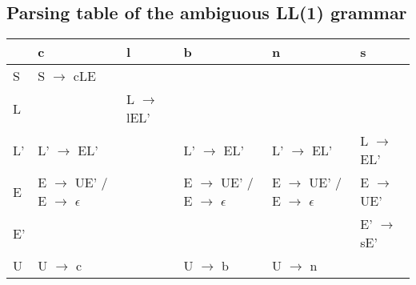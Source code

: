 \documentclass[11pt]{article}
\begin{document}
\subsection{Parsing table of the ambiguous LL(1) grammar}
\label{sec:org758a84c}
\begin{center}
\begin{tabular}{llllll}
 & c & l & b & n & s\\
\hline
S & S \(\rightarrow\) cLE &  &  &  & \\
L &  & L \(\rightarrow\) lEL' &  &  & \\
L' & L' \(\rightarrow\) EL' &  & L' \(\rightarrow\) EL' & L' \(\rightarrow\) EL' & L \(\rightarrow\) EL'\\
E & E \(\rightarrow\) UE' / E \(\rightarrow\) \(\epsilon\) &  & E \(\rightarrow\) UE' / E \(\rightarrow\) \(\epsilon\) & E \(\rightarrow\) UE' / E \(\rightarrow\) \(\epsilon\) & E \(\rightarrow\) UE'\\
E' &  &  &  &  & E' \(\rightarrow\) sE'\\
U & U \(\rightarrow\) c &  & U \(\rightarrow\) b & U \(\rightarrow\) n & \\
\end{tabular}
\end{center}
\end{document}
